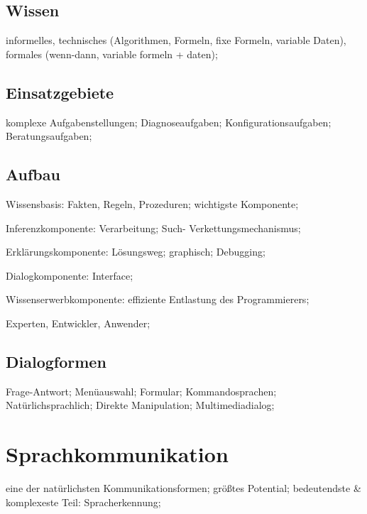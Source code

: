 \documentclass[german,color,6pt]{latex4ei/latex4ei_sheet}
\begin{document}
\begin{sectionbox}
\subsection{Wissen}
informelles, technisches (Algorithmen, Formeln, fixe Formeln, variable Daten), formales (wenn-dann, variable formeln + daten);
\end{sectionbox}

\begin{sectionbox}
\subsection{Einsatzgebiete}
komplexe Aufgabenstellungen; Diagnoseaufgaben; Konfigurationsaufgaben; Beratungsaufgaben;
\end{sectionbox}

\begin{sectionbox}
\subsection{Aufbau}
Wissensbasis: Fakten, Regeln, Prozeduren; wichtigste Komponente;

Inferenzkomponente: Verarbeitung; Such- Verkettungsmechanismus;

Erklärungskomponente: Lösungsweg; graphisch; Debugging;

Dialogkomponente: Interface;

Wissenserwerbkomponente: effiziente Entlastung des Programmierers;

Experten, Entwickler, Anwender;
\end{sectionbox}

\begin{sectionbox}
\subsection{Dialogformen}
Frage-Antwort; Menüauswahl; Formular; Kommandosprachen; Natürlichsprachlich; Direkte Manipulation; Multimediadialog;
\end{sectionbox}

\section{Sprachkommunikation}
\begin{sectionbox}
eine der natürlichsten Kommunikationsformen; größtes Potential; bedeutendste \& komplexeste Teil: Spracherkennung;
\end{sectionbox}
\end{document}
